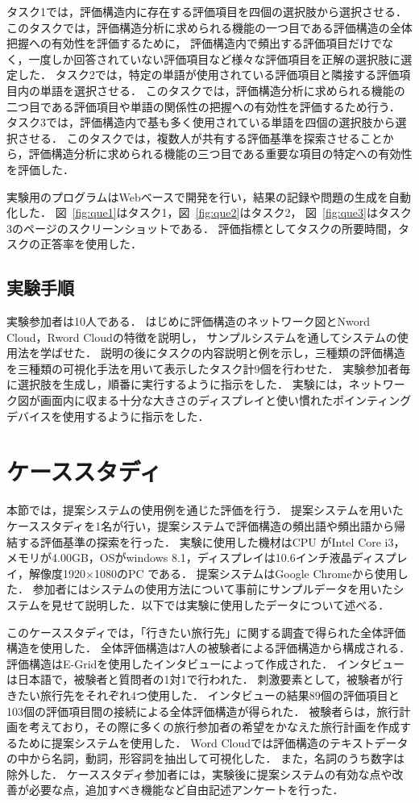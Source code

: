 \documentclass[syuuron]{kuee}
\begin{document}
			タスク1では，評価構造内に存在する評価項目を四個の選択肢から選択させる．
			このタスクでは，評価構造分析に求められる機能の一つ目である評価構造の全体把握への有効性を評価するために，
			評価構造内で頻出する評価項目だけでなく，一度しか回答されていない評価項目など様々な評価項目を正解の選択肢に選定した．
			タスク2では，特定の単語が使用されている評価項目と隣接する評価項目内の単語を選択させる．
			このタスクでは，評価構造分析に求められる機能の二つ目である評価項目や単語の関係性の把握への有効性を評価するため行う．
			タスク3では，評価構造内で基も多く使用されている単語を四個の選択肢から選択させる．
			このタスクでは，複数人が共有する評価基準を探索させることから，評価構造分析に求められる機能の三つ目である重要な項目の特定への有効性を評価した．
			
			実験用のプログラムはWebベースで開発を行い，結果の記録や問題の生成を自動化した．
			図~\ref{fig:que1}はタスク1，図~\ref{fig:que2}はタスク2，
			図~\ref{fig:que3}はタスク3のページのスクリーンショットである．
			評価指標としてタスクの所要時間，タスクの正答率を使用した．
		
		\subsection{実験手順}
			実験参加者は10人である．
			はじめに評価構造のネットワーク図とNword Cloud，Rword Cloudの特徴を説明し，
			サンプルシステムを通してシステムの使用法を学ばせた．
			説明の後にタスクの内容説明と例を示し，三種類の評価構造を三種類の可視化手法を用いて表示したタスク計9個を行わせた．
			実験参加者毎に選択肢を生成し，順番に実行するように指示をした．
			実験には，ネットワーク図が画面内に収まる十分な大きさのディスプレイと使い慣れたポインティングデバイスを使用するように指示をした．
		
	\section{ケーススタディ}
		本節では，提案システムの使用例を通じた評価を行う．
		提案システムを用いたケーススタディを1名が行い，提案システムで評価構造の頻出語や頻出語から帰結する評価基準の探索を行った．
		実験に使用した機材はCPU がIntel Core i3，メモリが4.00GB，OSがwindows 8.1，ディスプレイは10.6インチ液晶ディスプレイ，解像度1920×1080のPC である．
		提案システムはGoogle Chromeから使用した．
		参加者にはシステムの使用方法について事前にサンプルデータを用いたシステムを見せて説明した．以下では実験に使用したデータについて述べる．
		
		このケーススタディでは，「行きたい旅行先」に関する調査で得られた全体評価構造を使用した．
		全体評価構造は7人の被験者による評価構造から構成される．
		評価構造はE-Gridを使用したインタビューによって作成された．
		インタビューは日本語で，被験者と質問者の1対1で行われた．
		刺激要素として，被験者が行きたい旅行先をそれぞれ4つ使用した．
		インタビューの結果89個の評価項目と103個の評価項目間の接続による全体評価構造が得られた．
		被験者らは，旅行計画を考えており，その際に多くの旅行参加者の希望をかなえた旅行計画を作成するために提案システムを使用した．
		Word Cloudでは評価構造のテキストデータの中から名詞，動詞，形容詞を抽出して可視化した．
		また，名詞のうち数字は除外した．
		ケーススタディ参加者には，実験後に提案システムの有効な点や改善が必要な点，追加すべき機能など自由記述アンケートを行った．
		
\end{document}

